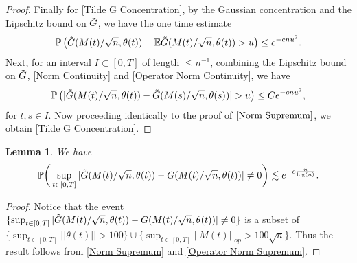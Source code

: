 \documentclass{amsart}
\newtheorem{lm}[thm]{Lemma}
\numberwithin{equation}{section}
\newcommand{\E}{\mathbb{E}}
\newcommand{\pr}{\mathbb{P}}
\begin{document}
\begin{proof}
Finally for \eqref{Tilde G Concentration}, by the Gaussian concentration and the Lipschitz bound on $\Tilde{G}$, we have the one time estimate
\begin{equation*}
    \pr\left(\Tilde{G}(M(t)/\sqrt{n},\theta(t))-\E\Tilde{G}(M(t)/\sqrt{n},\theta(t))>u\right)\leq e^{-c n u^2}.
\end{equation*}
Next, for an interval $I \subset [0,T]$ of length $\leq n^{-1}$, combining the Lipschitz bound on $\Tilde{G}$, \eqref{Norm Continuity} and \eqref{Operator Norm Continuity}, we have 
\begin{equation}\label{two time tildeG estimate}
    \pr\left(|\Tilde{G}(M(t)/\sqrt{n},\theta(t))-\Tilde{G}(M(s)/\sqrt{n},\theta(s))|>u\right)\leq C e^{-c n u^2},
\end{equation}
for $t,s \in I$. Now proceeding identically to the proof of $\eqref{Norm Supremum}$, we obtain \eqref{Tilde G Concentration}.
\end{proof}

\begin{lm}
We have
    \begin{equation}\label{G almost always tilde G}
        \pr\bigg(\sup_{t \in [0,T]}|\Tilde{G}(M(t)/\sqrt{n},\theta(t))-G(M(t)/\sqrt{n},\theta(t))| \neq 0\bigg) \lesssim e^{-c\frac{n}{\log(n)}}.
    \end{equation}
\end{lm}
\begin{proof}
Notice that the event $\{\sup_{t \in [0,T]}|\Tilde{G}(M(t)/\sqrt{n},\theta(t))-G(M(t)/\sqrt{n},\theta(t))| \neq 0\}$ is a subset of $\{\sup_{t \in [0,T]}||\theta(t)||>100\}\cup \{\sup_{t \in [0,T]}||M(t)||_{op}>100\sqrt{n}\}$. Thus the result follows from \eqref{Norm Supremum} and \eqref{Operator Norm Supremum}.
\end{proof}
\end{document}
